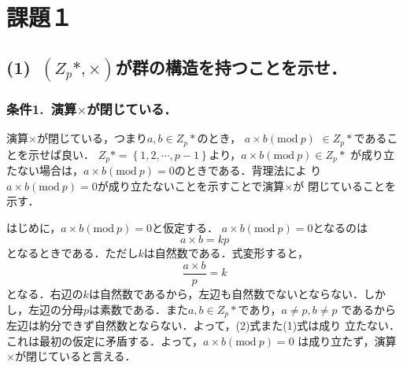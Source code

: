 \documentclass[a4paper,12pt]{jarticle}
\begin{document}
%
\title{\vspace{-30mm} }
\date{}
%
\maketitle
%
\vspace{-30mm}
%
\setlength{\abovedisplayskip}{0pt} %
\setlength{\belowdisplayskip}{0pt} %

\section*{課題１}
\vspace{-3mm}
\subsection*{(1)~$(Z_p*,\times)$が群の構造を持つことを示せ．}
\subsubsection*{条件1.~演算$\times$が閉じている．}
\vspace{-4mm}
演算$\times$が閉じている，つまり$a,b\in Z_p*$のとき，
$a\times b(\mathrm{mod}~p)$ $\in Z_p*$であることを示せば良い．
$Z_p*= \left\{1,2,\cdots,p-1 \right\}$より，$a\times b(\mathrm{mod}~p)\in Z_p*$
が成り立たない場合は，$a\times b(\mathrm{mod}~p)=0$のときである．背理法によ
り$a\times b(\mathrm{mod}~p)=0$が成り立たないことを示すことで演算$\times$が
閉じていることを示す．

はじめに，$a\times b(\mathrm{mod}~p)=0$と仮定する．
$a\times b(\mathrm{mod}~p)=0$となるのは
%
\begin{equation}
 a \times b =kp
\end{equation}
%
となるときである．ただし$k$は自然数である．式変形すると，
%
\begin{equation}
 \frac{a \times b}{p} = k
\end{equation}
%
となる．右辺の$k$は自然数であるから，左辺も自然数でないとならない．しか
し，左辺の分母$p$は素数である．また$a,b\in Z_p*$であり，$a\neq p,b\neq p$
であるから左辺は約分できず自然数とならない．よって，(2)式また(1)式は成り
立たない．これは最初の仮定に矛盾する．よって，$a\times b(\mathrm{mod}~p)=0$
は成り立たず，演算$\times$が閉じていると言える．
%
\vspace{-6mm}
\end{document}
